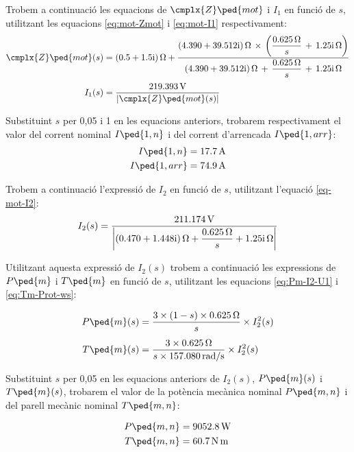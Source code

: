 \begin{exemple}
 Trobem a continuació les equacions de $\cmplx{Z}\ped{mot}$ i $I_1$ en funció de $s$, utilitzant les equacions \eqref{eq:mot-Zmot} i \eqref{eq:mot-I1} respectivament:
    \begin{align*}
		\cmplx{Z}\ped{mot}(s) &= \complexqty{0,5+j1,5}{\ohm} + \frac{\complexqty{4,390+j39,512}{\ohm}\,\times\,
	      \left(\dfrac{\qty{0,625}{\ohm}}{s}\, + \, \complexqty{j1,25}{\ohm}\right)}{\complexqty{4,390+j39,512}{\ohm}\,+\,
	   \dfrac{\qty{0,625}{\ohm}}{s}\, + \,\complexqty{j1,25}{\ohm}} \\[0.5ex]
   		I_1(s)  &= \frac{\qty{219,393}{V}}{|\cmplx{Z}\ped{mot}(s)|}  
	\end{align*} 
 
    Substituint $s$ per 0,05 i 1 en les equacions anteriors, trobarem respectivament el valor del corrent nominal $I\ped{1,n}$ i del corrent d'arrencada $I\ped{1,arr}$:
    \begin{align*}
        I\ped{1,n} &= \qty{17,7}{A} \\
        I\ped{1,arr} &= \qty{74,9}{A}
    \end{align*}
    
    Trobem a continuació l'expressió de $I_2$ en funció de $s$, utilitzant l'equació \eqref{eq-mot-I2}:
    \[
        I_2(s) = \frac{\qty{211,174}{V}}{\left| \complexqty{0,470+j1,448}{\ohm} + \dfrac{\qty{0,625}{\ohm}}{s} + \complexqty{j1,25}{\ohm} \right|}
    \]

    Utilitzant aquesta expressió de $I_2(s)$ trobem a continuació les expressions de $P\ped{m}$ i $T\ped{m}$ en funció de $s$, utilitzant les equacions \eqref{eq:Pm-I2-U1} i \eqref{eq:Tm-Prot-ws}:
    
     \begin{align*}
        P\ped{m}(s) &=\frac{ 3\times (1-s)\times \qty{0,625}{\ohm} }{s} \times  I_2^2(s) \\[1ex]
        T\ped{m}(s)  &=  \frac{3\times \qty{0,625}{\ohm}}{s\times \qty{157,080}{rad/s}} \times  I_2^2(s)
    \end{align*}

     Substituint $s$ per 0,05  en les equacions anteriors de $I_2(s)$, $P\ped{m}(s)$ i $T\ped{m}(s)$, trobarem el valor de la potència mecànica nominal $P\ped{m,n}$ i del parell mecànic nominal $T\ped{m,n}$:
     
     \begin{align*}
        P\ped{m,n} &= \qty{9052,8}{W} \\
         T\ped{m,n} &= \qty{60,7}{N.m} 
    \end{align*}   
    

\end{exemple}
